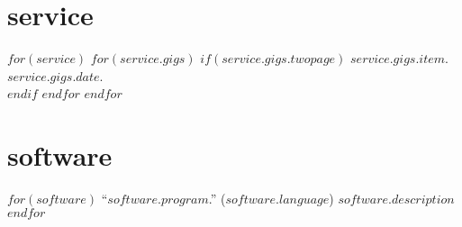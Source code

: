 \documentclass[11pt, letter]{article}
\begin{document}
\section{service}
$for(service)$
$for(service.gigs)$
$if(service.gigs.twopage)$
$service.gigs.item$. $service.gigs.date$.\\[.15cm]
$endif$
$endfor$
$endfor$

\section{software}

$for(software)$
``$software.program$.'' ($software.language$) $software.description$\\[.1cm]
$endfor$
\end{document}
